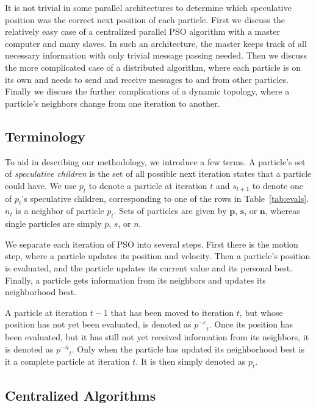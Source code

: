 \documentclass[oneside,honors]{honors}
\providecommand{\noeval}[1]{\ensuremath{#1^{-e}}}
\providecommand{\nonbest}[1]{\ensuremath{#1^{-n}}}
\providecommand{\p}{\ensuremath{p}}
\providecommand{\pset}{\ensuremath{\mathbf{p}}}
\providecommand{\s}{\ensuremath{s}}
\providecommand{\sset}{\ensuremath{\mathbf{s}}}
\providecommand{\n}{\ensuremath{n}}
\providecommand{\nset}{\ensuremath{\mathbf{n}}}
\begin{document}
It is not trivial in some parallel architectures to determine which speculative
position was the correct next position of each particle.  First we discuss the
relatively easy case of a centralized parallel PSO algorithm with a master
computer and many slaves.  In such an architecture, the master keeps track of
all necessary information with only trivial message passing needed.  Then we
discuss the more complicated case of a distributed algorithm, where each
particle is on its own and needs to send and receive messages to and from other
particles.  Finally we discuss the further complications of a dynamic topology,
where a particle's neighbors change from one iteration to another.

\subsection{Terminology}

To aid in describing our methodology, we introduce a few terms.  A particle's
set of \emph{speculative children} is the set of all possible next iteration
states that a particle could have.  We use $\p_t$ to denote a particle at
iteration $t$ and $\s_{t+1}$ to denote one of $\p_t$'s speculative children,
corresponding to one of the rows in Table~\ref{tab:evals}.  $\n_t$ is a
neighbor of particle $\p_t$.  Sets of particles are given by $\pset$, $\sset$,
or $\nset$, whereas single particles are simply $\p$, $\s$, or $\n$.

We separate each iteration of PSO into several steps.  First there is the
motion step, where a particle updates its position and velocity.  Then a
particle's position is evaluated, and the particle updates its current value
and its personal best.  Finally, a particle gets information from its neighbors
and updates its neighborhood best.

A particle at iteration $t-1$ that has been moved to iteration $t$, but whose
position has not yet been evaluated, is denoted as $\noeval{\p}_t$.  Once its
position has been evaluated, but it has still not yet received information from
its neighbors, it is denoted as $\nonbest{\p}_t$.  Only when the particle has
updated its neighborhood best is it a complete particle at iteration $t$.  It is
then simply denoted as $\p_t$.

\subsection{Centralized Algorithms}
\end{document}
